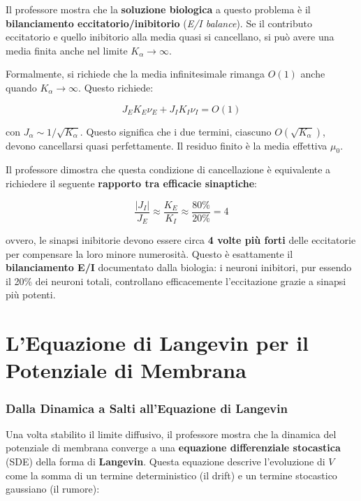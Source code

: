 Il professore mostra che la \textbf{soluzione biologica} a questo problema è il \textbf{bilanciamento eccitatorio/inibitorio} (\textit{E/I balance}). Se il contributo eccitatorio e quello inibitorio alla media quasi si cancellano, si può avere una media finita anche nel limite $K_\alpha \to \infty$.

Formalmente, si richiede che la media infinitesimale rimanga $O(1)$ anche quando $K_\alpha \to \infty$. Questo richiede:

\begin{equation}
J_E K_E \nu_E + J_I K_I \nu_I = O(1)
\end{equation}

con $J_\alpha \sim 1/\sqrt{K_\alpha}$. Questo significa che i due termini, ciascuno $O(\sqrt{K_\alpha})$, devono cancellarsi quasi perfettamente. Il residuo finito è la media effettiva $\mu_0$.

Il professore dimostra che questa condizione di cancellazione è equivalente a richiedere il seguente \textbf{rapporto tra efficacie sinaptiche}:

\begin{equation}
\frac{|J_I|}{J_E} \approx \frac{K_E}{K_I} \approx \frac{80\%}{20\%} = 4
\end{equation}

ovvero, le sinapsi inibitorie devono essere circa \textbf{4 volte più forti} delle eccitatorie per compensare la loro minore numerosità. Questo è esattamente il \textbf{bilanciamento E/I} documentato dalla biologia: i neuroni inibitori, pur essendo il 20\% dei neuroni totali, controllano efficacemente l'eccitazione grazie a sinapsi più potenti.

\section{L'Equazione di Langevin per il Potenziale di Membrana}

\subsubsection{Dalla Dinamica a Salti all'Equazione di Langevin}

Una volta stabilito il limite diffusivo, il professore mostra che la dinamica del potenziale di membrana converge a una \textbf{equazione differenziale stocastica} (SDE) della forma di \textbf{Langevin}. Questa equazione descrive l'evoluzione di $V$ come la somma di un termine deterministico (il drift) e un termine stocastico gaussiano (il rumore):

